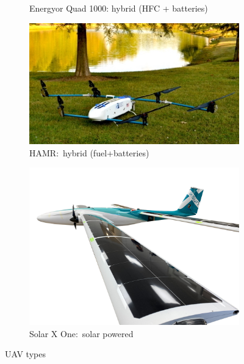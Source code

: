 \begin{figure}[htb!]
\begin{subfigure}[t]{0.35\textwidth}
  \caption{Energyor Quad 1000: hybrid (HFC + batteries)~\cite{energyorDrone}}%
  \label{fig:uav-energyor-hfc}
  \end{subfigure}
  \begin{subfigure}[t]{0.35\textwidth}
  \includegraphics[width=1.0\textwidth]{./img/jpg/uav-HAMR-FuelElectric.jpg}
  \caption{HAMR:~hybrid (fuel+batteries)~\cite{hamrDrone}}%
  \label{fig:uav-hamr-fuel}
\end{subfigure}
  \begin{subfigure}[t]{0.35\textwidth}
  \includegraphics[width=1.0\textwidth]{./img/png/uav-solarXOne.png}
  \caption{Solar X One:~solar powered~\cite{solarXOneDrone}}%
  \label{fig:uav-solarX}
\end{subfigure}
%
  \caption{UAV types}%
  \label{fig:uav-types}
\end{figure}
%

